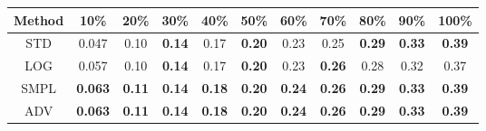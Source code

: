 \documentclass{standalone}
\begin{document}
\begin{tabular}{c|cccccccccc}
      \toprule
      Method & 10\% & 20\% & 30\% & 40\% & 50\% & 60\% & 70\% & 80\% & 90\% & 100\% \\
      \midrule
STD & 0.047 & 0.10 & \textbf{0.14} & 0.17 & \textbf{0.20} & 0.23 & 0.25 & \textbf{0.29} & \textbf{0.33} & \textbf{0.39}\\
LOG & 0.057 & 0.10 & \textbf{0.14} & 0.17 & \textbf{0.20} & 0.23 & \textbf{0.26} & 0.28 & 0.32 & 0.37\\
SMPL & \textbf{0.063} & \textbf{0.11} & \textbf{0.14} & \textbf{0.18} & \textbf{0.20} & \textbf{0.24} & \textbf{0.26} & \textbf{0.29} & \textbf{0.33} & \textbf{0.39}\\
ADV & \textbf{0.063} & \textbf{0.11} & \textbf{0.14} & \textbf{0.18} & \textbf{0.20} & \textbf{0.24} & \textbf{0.26} & \textbf{0.29} & \textbf{0.33} & \textbf{0.39}\\
  \bottomrule
\end{tabular}
\end{document}
